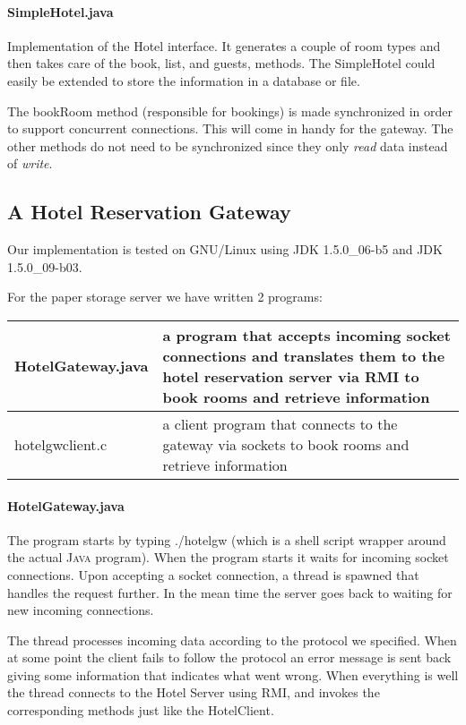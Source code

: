 \documentclass[a4paper,10pt]{article}
\begin{document}
\paragraph{SimpleHotel.java}
Implementation of the Hotel interface. It generates a couple of room types and then takes care of the book, list, and guests, methods. The SimpleHotel could easily be extended to store the information in a database or file.

The bookRoom method (responsible for bookings) is made synchronized in order to support concurrent connections. This will come in handy for the gateway. The other methods do not need to be synchronized since they only \emph{read} data instead of \emph{write}.

\subsection{A Hotel Reservation Gateway}\label{sec:gateway}

Our implementation is tested on GNU/Linux using JDK 1.5.0\_06-b5 and JDK 1.5.0\_09-b03.

For the paper storage server we have written 2 programs:
\begin{center}
\begin{tabular}{ l | p{8.2cm} }
HotelGateway.java & a program that accepts incoming socket connections and translates them to the hotel reservation server via RMI to book rooms and retrieve information\\ \hline
hotelgwclient.c & a client program that connects to the gateway via sockets to book rooms and retrieve information\\
\end{tabular}
\end{center}

\paragraph{HotelGateway.java}
The program starts by typing ./hotelgw (which is a shell script wrapper around the actual \textsc{Java} program). When the program starts it waits for incoming socket connections. Upon accepting a socket connection, a thread is spawned that handles the request further. In the mean time the server goes back to waiting for new incoming connections.

The thread processes incoming data according to the protocol we specified. When at some point the client fails to follow the protocol an error message is sent back giving some information that indicates what went wrong. When everything is well the thread connects to the Hotel Server using RMI, and invokes the corresponding methods just like the HotelClient.
\end{document}
